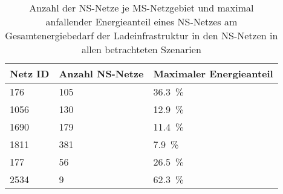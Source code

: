 {
\renewcommand{\arraystretch}{1.2}%
\begin{table}[H]
	\begin{center}
		\caption{Anzahl der NS-Netze je MS-Netzgebiet und maximal anfallender Energieanteil eines NS-Netzes am Gesamtenergiebedarf der Ladeinfrastruktur in den NS-Netzen in allen betrachteten Szenarien}
		\begin{tabu} to 0.7\textwidth {X[0.75] X[1, r] X[1.5, r]}
			\toprule
			Netz ID    & Anzahl NS-Netze & Maximaler Energieanteil 			\\ \midrule
			\num{176}  & \num{105}       & \SI{36.3}{\percent}              \\
			\num{1056} & \num{130}       & \SI{12.9}{\percent}              \\
			\num{1690} & \num{179}       & \SI{11.4}{\percent}              \\
			\num{1811} & \num{381}       & \SI{7.9}{\percent}               \\
			\num{177}  & \num{56}        & \SI{26.5}{\percent}              \\
			\num{2534} & \num{9}         & \SI{62.3}{\percent}              \\ \bottomrule
		\end{tabu}
		\label{tab:largestLVGridShare}
	\end{center}
	\vspace{-3mm}%
\end{table}
}